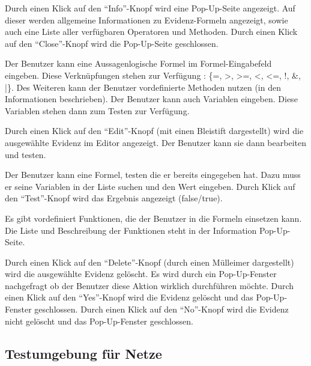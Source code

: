 \documentclass[parskip=full,11pt,twoside]{scrartcl}
\begin{document}
\pagebreak
{}

Durch einen Klick auf den \enquote{Info}-Knopf wird eine Pop-Up-Seite angezeigt.
Auf dieser werden allgemeine Informationen zu Evidenz-Formeln angezeigt, sowie auch eine Liste aller verfügbaren Operatoren und Methoden.
Durch einen Klick auf den \enquote{Close}-Knopf wird die Pop-Up-Seite geschlossen.


Der Benutzer kann eine Aussagenlogische Formel im Formel-Eingabefeld eingeben.
Diese Verknüpfungen stehen zur Verfügung : \{=, >, >=, <, <=, !, \&, |\}.
Des Weiteren kann der Benutzer vordefinierte Methoden nutzen (in den Informationen beschrieben).
Der Benutzer kann auch Variablen eingeben. Diese Variablen stehen dann zum Testen zur Verfügung.


Durch einen Klick auf den \enquote{Edit}-Knopf (mit einen Bleistift dargestellt)
wird die ausgewählte Evidenz im Editor angezeigt. Der Benutzer kann sie dann bearbeiten und testen.


Der Benutzer kann eine Formel, testen die er bereits eingegeben hat. Dazu muss er seine Variablen in der Liste suchen und den Wert eingeben. Durch Klick auf den \enquote{Test}-Knopf wird das Ergebnis angezeigt (false/true).


Es gibt vordefiniert Funktionen, die der Benutzer in die Formeln einsetzen kann. Die Liste und Beschreibung der Funktionen steht in der Information Pop-Up-Seite.


Durch einen Klick auf den \enquote{Delete}-Knopf (durch einen Mülleimer dargestellt) wird die ausgewählte Evidenz gelöscht. Es wird durch ein Pop-Up-Fenster nachgefragt ob der Benutzer diese Aktion wirklich durchführen möchte.
Durch einen Klick auf den \enquote{Yes}-Knopf wird die Evidenz gelöscht und das Pop-Up-Fenster geschlossen.
Durch einen Klick auf den \enquote{No}-Knopf wird die Evidenz nicht gelöscht und das Pop-Up-Fenster geschlossen.

\subsection{Testumgebung für Netze}
\end{document}
